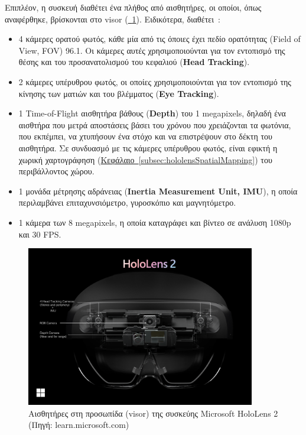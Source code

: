 Επιπλέον, η συσκευή διαθέτει ένα πλήθος από αισθητήρες, οι οποίοι, όπως αναφέρθηκε, βρίσκονται στο visor (\hyperref[fig:hololensDeviceVisor]{\schema~\ref*{fig:hololensDeviceVisor}}). Ειδικότερα, διαθέτει~\cite{scooley_2023_hololens}:
\begin{itemize}
    \item 4 κάμερες ορατού φωτός, κάθε μία από τις όποιες έχει πεδίο ορατότητας (Field of View, FOV) 96.1\textdegree. Οι κάμερες αυτές χρησιμοποιούνται για τον εντοπισμό της θέσης και του προσανατολισμού του κεφαλιού (\textbf{Head Tracking}).
    \item 2 κάμερες υπέρυθρου φωτός, οι οποίες χρησιμοποιούνται για τον εντοπισμό της κίνησης των ματιών και του βλέμματος (\textbf{Eye Tracking}).
    \item 1 Time-of-Flight αισθητήρα βάθους (\textbf{Depth}) του 1 megapixels, δηλαδή ένα αισθτήρα που μετρά αποστάσεις βάσει του χρόνου που χρειάζονται τα φωτόνια, που εκπέμπει, να χτυπήσουν ένα στόχο και να επιστρέψουν στο δέκτη του αισθητήρα. Σε συνδυασμό με τις  κάμερες υπέρυθρου φωτός, είναι εφικτή η χωρική χαρτογράφηση (\hyperref[subsec:hololensSpatialMapping]{Κεφάλαιο~\ref*{subsec:hololensSpatialMapping}}) του περιβάλλοντος χώρου. 
    \item 1 μονάδα μέτρησης αδράνειας (\textbf{Inertia Measurement Unit, IMU}), η οποία περιλαμβάνει επιταχυνσιόμετρο, γυροσκόπιο και μαγνητόμετρο.
    \item 1 κάμερα των 8 megapixels, η οποία καταγράφει και βίντεο σε ανάλυση 1080p και 30 FPS\@.
\end{itemize}
\begin{figure}[!hb]
    \centering
    \includegraphics[width=100mm]{images/microsoft_hololens_2_parts1.png}
    \caption{Αισθητήρες στη προσωπίδα (visor) της συσκεύης Microsoft HoloLens 2 {\footnotesize (Πηγή: learn.microsoft.com)}}\label{fig:hololensDeviceVisor}
\end{figure}

